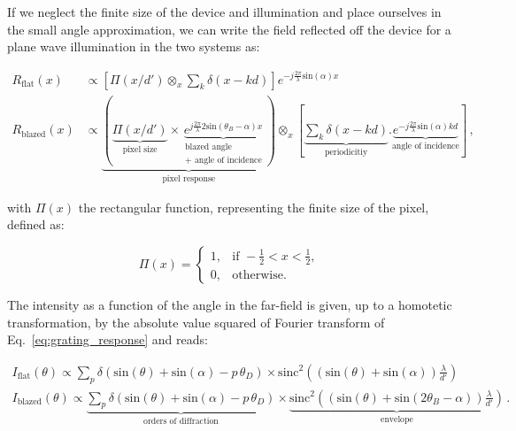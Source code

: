 \documentclass[12pt]{iopart}
\begin{document}
\begin{optional}
  If we neglect the finite size of the device and illumination 
  and place ourselves in the small angle approximation, 
  we can write the field reflected off the device 
  for a plane wave illumination
  in the two systems as: 

  \begin{equation}
  \begin{aligned}
    R_\text{flat}(x) &\propto \left[\Pi\left(x/d'\right) \otimes_x \sum_k \delta(x-k d)\right]e^{-j\frac{2\pi}{\lambda}\text{sin}(\alpha) x} \\
    R_\text{blazed}(x) &\propto 
        \underbrace{
          \left(
            \underbrace{\Pi\left(x/d'\right)}_\text{pixel size}
              \times 
              \underbrace{e^{j\frac{2\pi}{\lambda}2\text{sin}(\theta_B-\alpha) x}}_{\substack{\text{blazed angle} \\ \text{+ angle of incidence}}}
          \right) 
        }_\text{pixel response}
        \otimes_x 
        \left[
        \underbrace{\sum_k \delta(x-k d) }_\text{periodicitiy}
        .
        \underbrace{
        e^{-j\frac{2\pi}{\lambda}\text{sin}(\alpha) kd}
      }_\text{angle of incidence}
      \right]
      \, ,
  \end{aligned}
  \label{eq:grating_response}
  \end{equation}

  with $\Pi(x)$ the rectangular function,
  representing the finite size of the pixel, 
  defined as:

  \begin{equation}
    \Pi(x) = 
    \begin{cases}
    1, & \text{if } -\frac{1}{2} < x < \frac{1}{2}, \\
    0, & \text{otherwise}.
    \end{cases}
    \end{equation}

  The intensity as a function of the angle in the far-field 
  is given, up to a homotetic transformation, 
  by the absolute value squared of 
  Fourier transform of Eq.~\ref{eq:grating_response}
  and reads: 


  \begin{equation}
    \begin{aligned}
      I_\text{flat}(\theta) \propto 
        \sum_p \delta(\text{sin}(\theta)+\text{sin}(\alpha)-p\,\theta_D) 
          \times 
        \text{sinc}^2\left( (\text{sin}(\theta)+\text{sin}(\alpha)) \frac{\lambda}{d'}\right)\\
        I_\text{blazed}(\theta) \propto 
        \underbrace{
          \sum_p \delta(\text{sin}(\theta)+\text{sin}(\alpha)-p\,\theta_D) 
        }_\text{orders of diffraction}
        \times 
        \underbrace{
          \text{sinc}^2\left( (\text{sin}(\theta)+\text{sin}(2\theta_B-\alpha)) \frac{\lambda}{d'}\right)
         }_\text{envelope} \, .
    \end{aligned}
  \end{equation}

\end{optional}
\end{document}
